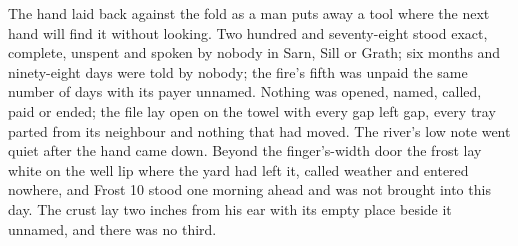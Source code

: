 The hand laid back against the fold as a man puts away a tool where the next hand will find it without looking. Two hundred and seventy-eight stood exact, complete, unspent and spoken by nobody in Sarn, Sill or Grath; six months and ninety-eight days were told by nobody; the fire's fifth was unpaid the same number of days with its payer unnamed. Nothing was opened, named, called, paid or ended; the file lay open on the towel with every gap left gap, every tray parted from its neighbour and nothing that had moved. The river's low note went quiet after the hand came down. Beyond the finger's-width door the frost lay white on the well lip where the yard had left it, called weather and entered nowhere, and Frost 10 stood one morning ahead and was not brought into this day. The crust lay two inches from his ear with its empty place beside it unnamed, and there was no third.
